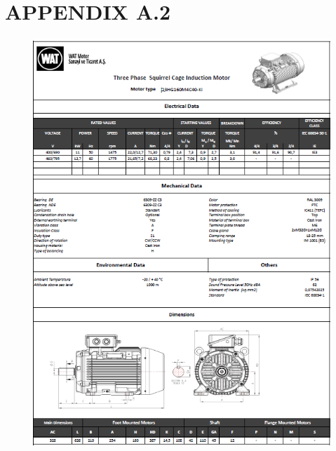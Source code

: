 


\clearpage
\section*{APPENDIX A.2}
\vspace*{16pt}
\begin{figure}[h]
	\centering
	\includegraphics[scale = 0.9,keepaspectratio=true]{./fig/motorparams.PNG}
	\label{motorparams}
\end{figure}

